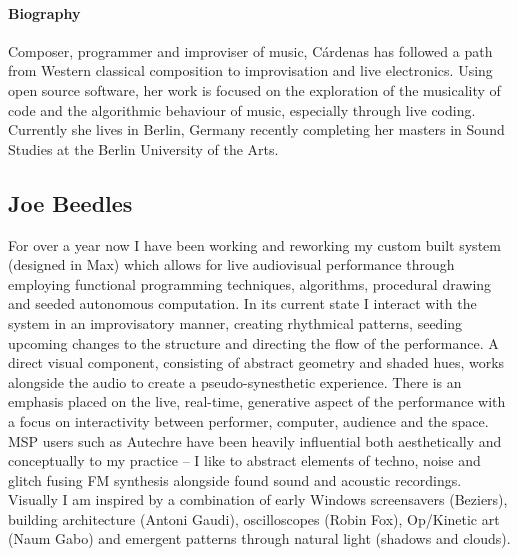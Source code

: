 \documentclass[sigplan,10pt,review]{acmart}\settopmatter{printfolios=true}
\begin{document}
\paragraph{Biography} Composer, programmer and improviser of music, C\'{a}rdenas has
followed a path from Western classical composition to improvisation
and live electronics. Using open source software, her work is focused
on the exploration of the musicality of code and the algorithmic
behaviour of music, especially through live coding. Currently she
lives in Berlin, Germany recently completing her masters in Sound
Studies at the Berlin University of the Arts.

\subsection{Joe Beedles}

For over a year now I have been working and reworking my custom built
system (designed in Max) which allows for live audiovisual performance
through employing functional programming techniques, algorithms,
procedural drawing and seeded autonomous computation. In its current
state I interact with the system in an improvisatory manner, creating
rhythmical patterns, seeding upcoming changes to the structure and
directing the flow of the performance. A direct visual component,
consisting of abstract geometry and shaded hues, works alongside the
audio to create a pseudo-synesthetic experience. There is an emphasis
placed on the live, real-time, generative aspect of the performance
with a focus on interactivity between performer, computer, audience
and the space. MSP users such as Autechre have been heavily
influential both aesthetically and conceptually to my practice -- I
like to abstract elements of techno, noise and glitch fusing FM
synthesis alongside found sound and acoustic recordings. Visually I am
inspired by a combination of early Windows screensavers (Beziers),
building architecture (Antoni Gaudi), oscilloscopes (Robin Fox),
Op/Kinetic art (Naum Gabo) and emergent patterns through natural light
(shadows and clouds).
\end{document}
